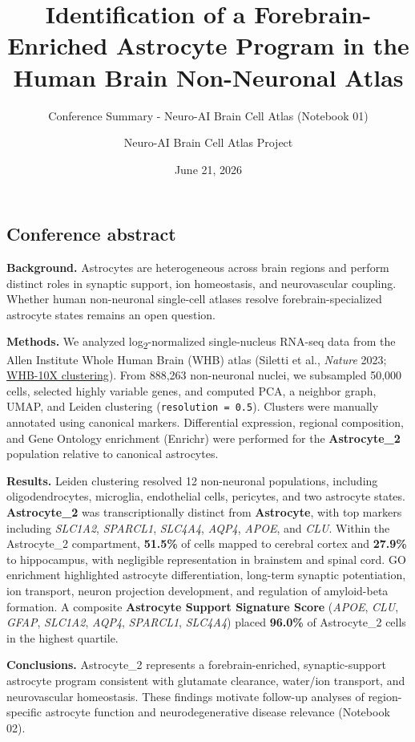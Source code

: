 \documentclass[
  11pt,
]{article}
\title{Identification of a Forebrain-Enriched Astrocyte Program in the
Human Brain Non-Neuronal Atlas}
\subtitle{Conference Summary - Neuro-AI Brain Cell Atlas (Notebook 01)}
\author{Neuro-AI Brain Cell Atlas Project}
\date{June 21, 2026}
\begin{document}
\maketitle


\subsection{Conference abstract}\label{conference-abstract}

\textbf{Background.} Astrocytes are heterogeneous across brain regions
and perform distinct roles in synaptic support, ion homeostasis, and
neurovascular coupling. Whether human non-neuronal single-cell atlases
resolve forebrain-specialized astrocyte states remains an open question.

\textbf{Methods.} We analyzed log\textsubscript{2}-normalized
single-nucleus RNA-seq data from the Allen Institute Whole Human Brain
(WHB) atlas (Siletti et al., \emph{Nature} 2023;
\href{https://alleninstitute.github.io/abc_atlas_access/descriptions/WHB-10X-clustering.html}{WHB-10X
clustering}). From 888,263 non-neuronal nuclei, we subsampled 50,000
cells, selected highly variable genes, and computed PCA, a neighbor
graph, UMAP, and Leiden clustering (\texttt{resolution\ =\ 0.5}).
Clusters were manually annotated using canonical markers. Differential
expression, regional composition, and Gene Ontology enrichment (Enrichr)
were performed for the \textbf{Astrocyte\_2} population relative to
canonical astrocytes.

\textbf{Results.} Leiden clustering resolved 12 non-neuronal
populations, including oligodendrocytes, microglia, endothelial cells,
pericytes, and two astrocyte states. \textbf{Astrocyte\_2} was
transcriptionally distinct from \textbf{Astrocyte}, with top markers
including \emph{SLC1A2}, \emph{SPARCL1}, \emph{SLC4A4}, \emph{AQP4},
\emph{APOE}, and \emph{CLU}. Within the Astrocyte\_2 compartment,
\textbf{51.5\%} of cells mapped to cerebral cortex and \textbf{27.9\%}
to hippocampus, with negligible representation in brainstem and spinal
cord. GO enrichment highlighted astrocyte differentiation, long-term
synaptic potentiation, ion transport, neuron projection development, and
regulation of amyloid-beta formation. A composite \textbf{Astrocyte
Support Signature Score} (\emph{APOE}, \emph{CLU}, \emph{GFAP},
\emph{SLC1A2}, \emph{AQP4}, \emph{SPARCL1}, \emph{SLC4A4}) placed
\textbf{96.0\%} of Astrocyte\_2 cells in the highest quartile.

\textbf{Conclusions.} Astrocyte\_2 represents a forebrain-enriched,
synaptic-support astrocyte program consistent with glutamate clearance,
water/ion transport, and neurovascular homeostasis. These findings
motivate follow-up analyses of region-specific astrocyte function and
neurodegenerative disease relevance (Notebook 02).
\end{document}
